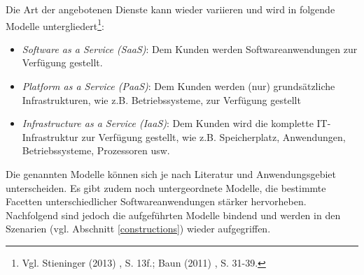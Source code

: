 Die Art der angebotenen Dienste kann wieder variieren und wird in folgende Modelle untergliedert\footnote{Vgl. Stieninger (2013) \cite{stieninger}, S. 13f.; Baun (2011) \cite{baun}, S. 31-39.}:
\begin{itemize}
	\item \textit{Software as a Service (SaaS)}: Dem Kunden werden Softwareanwendungen zur Verfügung gestellt.
	\item \textit{Platform as a Service (PaaS)}: Dem Kunden werden (nur) grundsätzliche Infrastrukturen, wie z.B. Betriebssysteme, zur Verfügung gestellt
	\item \textit{Infrastructure as a Service (IaaS)}: Dem Kunden wird die komplette IT-Infrastruktur zur Verfügung gestellt, wie z.B. Speicherplatz, Anwendungen, Betriebssysteme, Prozessoren usw.
\end{itemize}

Die genannten Modelle können sich je nach Literatur und Anwendungsgebiet unterscheiden. Es gibt zudem noch untergeordnete Modelle, die bestimmte Facetten unterschiedlicher Softwareanwendungen stärker hervorheben. Nachfolgend sind jedoch die aufgeführten Modelle bindend und werden in den Szenarien (vgl. Abschnitt \ref{constructions}) wieder aufgegriffen.